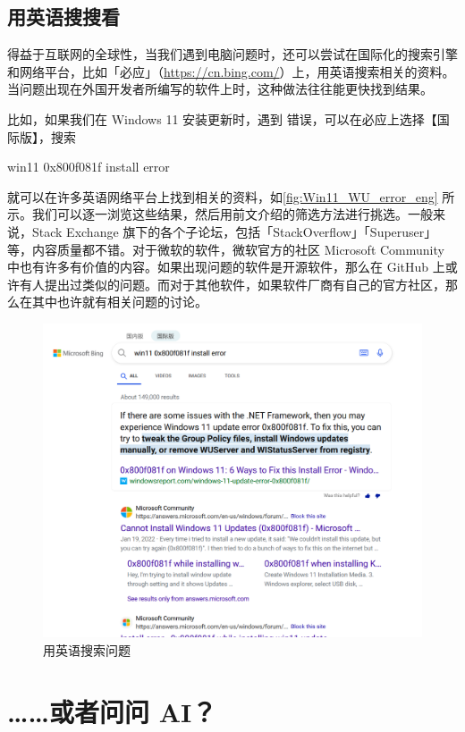 \subsection{用英语搜搜看}

得益于互联网的全球性，当我们遇到电脑问题时，还可以尝试在国际化的搜索引擎和网络平台，比如「必应」（\url{https://cn.bing.com/}）上，用英语搜索相关的资料。当问题出现在外国开发者所编写的软件上时，这种做法往往能更快找到结果。

比如，如果我们在 Windows 11 安装更新时，遇到  错误，可以在必应上选择【国际版】，搜索

\begin{quoting}
  win11 0x800f081f install error
\end{quoting}

就可以在许多英语网络平台上找到相关的资料，如\autoref{fig:Win11_WU_error_eng} 所示。我们可以逐一浏览这些结果，然后用前文介绍的筛选方法进行挑选。一般来说，Stack Exchange 旗下的各个子论坛，包括「StackOverflow」「Superuser」等，内容质量都不错。对于微软的软件，微软官方的社区 Microsoft Community 中也有许多有价值的内容。如果出现问题的软件是开源软件，那么在 GitHub 上或许有人提出过类似的问题。而对于其他软件，如果软件厂商有自己的官方社区，那么在其中也许就有相关问题的讨论。

\begin{figure}[htb!]
  \centering
  \includegraphics[width=.75\textwidth]{assets/basic/Win11_WU_error_eng.png}
  \caption{用英语搜索问题}
  \label{fig:Win11_WU_error_eng}
\end{figure}

\section{……或者问问 AI？}

